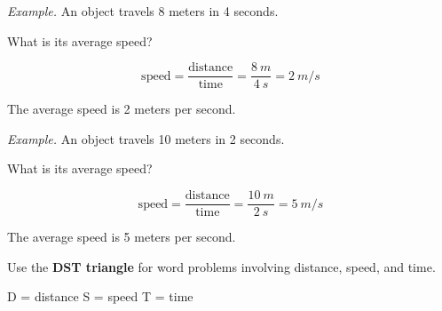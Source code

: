 \documentclass[14pt,t,]{beamer}
\begin{document}
\begin{frame}
\textit{Example.} An object travels 8 meters in 4 seconds. 


What is its average speed?

\pause

\begin{equation*}
    \mathrm{speed} = \mathrm{\frac{distance}{time}} = \frac{\SI{8}{m}}{\SI{4}{s}} = \boxed{\SI{2}{m/s}}
\end{equation*}
\vspace{1ex}

\pause

The average speed is 2 meters per second.
\end{frame}

\begin{frame}
\textit{Example.} An object travels 10 meters in 2 seconds. 


What is its average speed?

\pause

\begin{equation*}
    \mathrm{speed} = \mathrm{\frac{distance}{time}} = \frac{\SI{10}{m}}{\SI{2}{s}} = \boxed{\SI{5}{m/s}}
\end{equation*}
\vspace{1ex}

\pause

The average speed is 5 meters per second.
\end{frame}

\begin{frame}
Use the \textbf{DST triangle} for word problems involving distance, speed, and time.

\begin{center}
\DSTtriangle %
\end{center}

\pause

\begin{center}
    D = distance \qquad 
    S = speed \qquad
    T = time
\end{center}
\end{frame}
\end{document}
